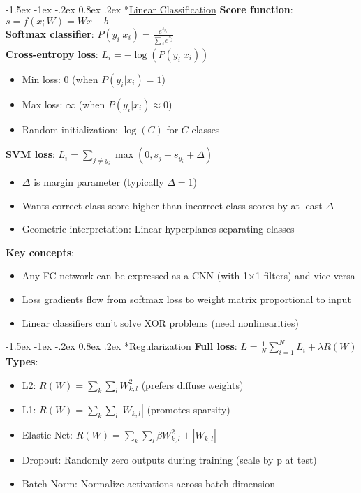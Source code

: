 \documentclass{article}
\makeatletter
\renewcommand\section{\@startsection{section}{1}{\z@}%
                                  {-1.5ex \@plus -1ex \@minus -.2ex}%
                                  {0.8ex \@plus.2ex}%
                                  {\normalfont\small\bfseries}}
\makeatother
\begin{document}
\fontsize{6pt}{7pt}\selectfont %

\begin{multicols}{3} %

\section*{\underline{Linear Classification}}
\textbf{Score function}: $s = f(x; W) = Wx + b$\\
\textbf{Softmax classifier}: $P(y_i|x_i) = \frac{e^{s_{y_i}}}{\sum_j e^{s_j}}$\\
\textbf{Cross-entropy loss}: $L_i = -\log(P(y_i|x_i))$
\begin{itemize}
\item Min loss: 0 (when $P(y_i|x_i)=1$)
\item Max loss: $\infty$ (when $P(y_i|x_i) \approx 0$)
\item Random initialization: $\log(C)$ for $C$ classes
\end{itemize}

\textbf{SVM loss}: $L_i = \sum_{j \neq y_i} \max(0, s_j - s_{y_i} + \Delta)$
\begin{itemize}
\item $\Delta$ is margin parameter (typically $\Delta = 1$)
\item Wants correct class score higher than incorrect class scores by at least $\Delta$
\item Geometric interpretation: Linear hyperplanes separating classes
\end{itemize}

\textbf{Key concepts}:
\begin{itemize}
\item Any FC network can be expressed as a CNN (with 1×1 filters) and vice versa
\item Loss gradients flow from softmax loss to weight matrix proportional to input
\item Linear classifiers can't solve XOR problems (need nonlinearities)
\end{itemize}

\section*{\underline{Regularization}}
\textbf{Full loss}: $L = \frac{1}{N} \sum_{i=1}^N L_i + \lambda R(W)$\\
\textbf{Types}:
\begin{itemize}
\item L2: $R(W) = \sum_k \sum_l W_{k,l}^2$ (prefers diffuse weights)
\item L1: $R(W) = \sum_k \sum_l |W_{k,l}|$ (promotes sparsity)
\item Elastic Net: $R(W) = \sum_k \sum_l \beta W_{k,l}^2 + |W_{k,l}|$
\item Dropout: Randomly zero outputs during training (scale by p at test)
\item Batch Norm: Normalize activations across batch dimension
\end{itemize}


\end{multicols}
\end{document}
